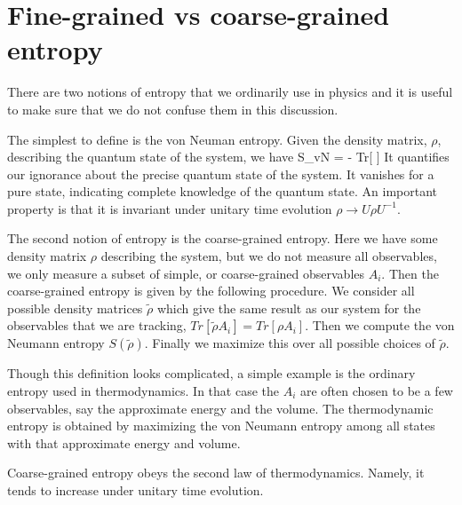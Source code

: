 \section{Fine-grained vs coarse-grained entropy} \label{finecoarse}

There are two notions of entropy that we ordinarily use in physics and it is useful to make sure that we do not confuse them in this discussion. 

The simplest to define is the von Neuman entropy. Given the density matrix, $\rho$,  describing the quantum state of the system, we have 
\be \label{vnfine}
S_{vN} = - Tr[ \rho \log \rho ] 
\ee
 It quantifies our ignorance about the precise quantum state of the system.    It vanishes for a pure state, indicating complete knowledge of the quantum state. An important property is that it is invariant under unitary time evolution $\rho \to U \rho U^{-1}$.  

The second notion of entropy  is the coarse-grained entropy. Here we have some density matrix $\rho$ describing the system, but we do not measure all observables, we only measure a subset of simple, or coarse-grained observables $A_i$. Then the coarse-grained entropy is given by the following procedure. We consider all possible density matrices $\tilde \rho$ which give the same result as our system for the observables that we are tracking, 
$Tr[ \tilde \rho A_i] =Tr[\rho A_i]$. Then we compute the von Neumann entropy $S(\tilde \rho)$. Finally we maximize this over all possible choices of $\tilde \rho$. 

Though this definition looks complicated, a simple example is the ordinary entropy used in thermodynamics. In that case the $A_i$ are often chosen to be a few observables, say the approximate energy and the volume. The thermodynamic entropy is obtained by maximizing the von Neumann entropy among all states with that approximate energy and volume. 

Coarse-grained entropy obeys the second law of thermodynamics. Namely, it  tends to increase under unitary time evolution. 

